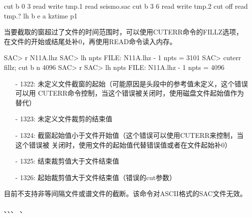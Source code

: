 \begin{SACCode}
cut b 0 3                                                                      
read                                                                           
write tmp.1                                                                    
read seismo.sac                                                                
cut b 3 6                                                                      
read                                                                           
write tmp.2                                                                    
cut off                                                                        
read tmp.?                                                                     
lh b e a kztime                                                                
p1  
\end{SACCode}

当要截取的窗超过了文件的时间范围时，可以使用CUTERR命令的FILLZ选项，
在文件的开始或结尾处补0，再使用READ命令读入内存。
\begin{SACCode}
SAC> r N11A.lhz
SAC> lh npts
FILE: N11A.lhz - 1
npts = 3101
SAC> cuterr fillz; cut b n 4096
SAC> r
SAC> lh npts
FILE: N11A.lhz - 1
npts = 4096
\end{SACCode}
 
\begin{itemize}
\item[-]1322: 未定义文件截窗的起始（可能原因是头段中的参考值未定义，这个错误可以用
    CUTERR命令控制，当这个错误被关闭时，使用磁盘文件起始值作为替代）
\item[-]1323: 未定义文件裁剪的结束值
\item[-]1324: 截窗起始值小于文件开始值（这个错误可以使用CUTERR来控制，当这个错误被
    关闭时，使用文件的起始值代替错误值或者在文件起始补0）
\item[-]1325: 结束裁剪值大于文件结束值
\item[-]1326: 起始裁剪值大于文件结束值（错误的cut参数）
\end{itemize}

目前不支持非等间隔文件或谱文件的截断。该命令对ASCII格式的SAC文件无效。

、、、
、
